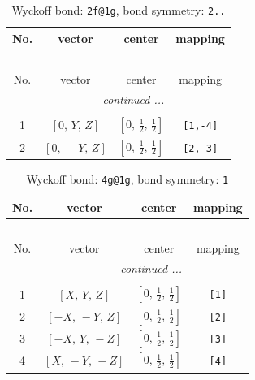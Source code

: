 \documentclass[fleqn,8pt]{jsarticle}
\begin{document}
\begin{longtable}{cccc}
\caption{Wyckoff bond: {\tt 2f@1g}, bond symmetry: {\tt 2..}}
 \\
 \hline \hline
No. & vector & center & mapping \\ \hline \endfirsthead

\multicolumn{3}{l}{\tablename\ \thetable{}} \\
 \hline \hline
No. & vector & center & mapping \\ \hline \endhead

 \hline \hline
\multicolumn{3}{r}{\footnotesize\it continued ...} \\ \endfoot

 \hline \hline
\multicolumn{3}{r}{} \\ \endlastfoot

1 & $\left[ 0,\, Y,\, Z \right]$ & $\left[ 0,\, \frac{1}{2},\, \frac{1}{2} \right]$ & {\tt [1,-4]} \\ \hline
2 & $\left[ 0,\, - Y,\, Z \right]$ & $\left[ 0,\, \frac{1}{2},\, \frac{1}{2} \right]$ & {\tt [2,-3]} \\
\end{longtable}
\renewcommand{\arraystretch}{1.2}
\begin{longtable}{cccc}
\caption{Wyckoff bond: {\tt 4g@1g}, bond symmetry: {\tt 1}}
 \\
 \hline \hline
No. & vector & center & mapping \\ \hline \endfirsthead

\multicolumn{3}{l}{\tablename\ \thetable{}} \\
 \hline \hline
No. & vector & center & mapping \\ \hline \endhead

 \hline \hline
\multicolumn{3}{r}{\footnotesize\it continued ...} \\ \endfoot

 \hline \hline
\multicolumn{3}{r}{} \\ \endlastfoot

1 & $\left[ X,\, Y,\, Z \right]$ & $\left[ 0,\, \frac{1}{2},\, \frac{1}{2} \right]$ & {\tt [1]} \\ \hline
2 & $\left[ - X,\, - Y,\, Z \right]$ & $\left[ 0,\, \frac{1}{2},\, \frac{1}{2} \right]$ & {\tt [2]} \\ \hline
3 & $\left[ - X,\, Y,\, - Z \right]$ & $\left[ 0,\, \frac{1}{2},\, \frac{1}{2} \right]$ & {\tt [3]} \\ \hline
4 & $\left[ X,\, - Y,\, - Z \right]$ & $\left[ 0,\, \frac{1}{2},\, \frac{1}{2} \right]$ & {\tt [4]} \\
\end{longtable}
\end{document}
